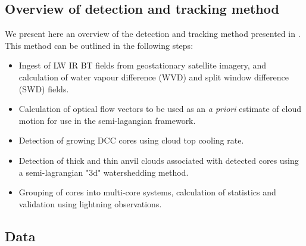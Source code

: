 \subsection{Overview of detection and tracking method}

We present here an overview of the detection and tracking method presented in \citet{jones_semi-lagrangian_2022}.
This method can be outlined in the following steps:

\begin{itemize}
    \item Ingest of LW IR BT fields from geostationary satellite imagery, and calculation of water vapour difference (WVD) and split window difference (SWD) fields.
    \item Calculation of optical flow vectors to be used as an \textit{a priori} estimate of cloud motion for use in the semi-lagangian framework.
    \item Detection of growing DCC cores using cloud top cooling rate.
    \item Detection of thick and thin anvil clouds associated with detected cores using a semi-lagrangian "3d" watershedding method. 
    \item Grouping of cores into multi-core systems, calculation of statistics and validation using lightning observations.
\end{itemize}

\subsection{Data}


